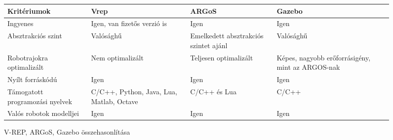 \begin{figure}[h]
    \begin{table}[H]
    \begin{footnotesize}
        \begin{center}
            \begin{tabular}{p{2.5cm}|p{3.5cm}|p{4cm}|p{4cm}}
            \textbf{Kritériumok}                    & V\-rep                              & ARGoS  & Gazebo \\
            \hline         
            Ingyenes                            & Igen, van fizetős verzió is         & Igen             & Igen \\
            \hline         
            Absztrakciós szint                  & Valósághű         & Emelkedett absztrakciós szintet ajánl             & Valósághű  \\
            \hline         
            Robotrajokra optimalizált           & Nem optimalizált         & Teljesen optimalizált           & Képes, nagyobb erőforrásigény, mint az ARGOS-nak  \\
            \hline         
            Nyílt forráskódú                    & Igen         & Igen            & Igen  \\
            \hline         
            Támogatott programozási nyelvek     & C/C++, Python, Java, Lua, Matlab, Octave          & C/C++ és Lua             & C/C++  \\
            \hline         
            Valós robotok modelljei             & Igen          & Igen             & Igen  \\
            \end{tabular}
        \end{center}
    \end{footnotesize}
    \end{table}
    \label{table:simulators}
    \caption{V-REP, ARGoS, Gazebo összehasonlítása}
\end{figure}